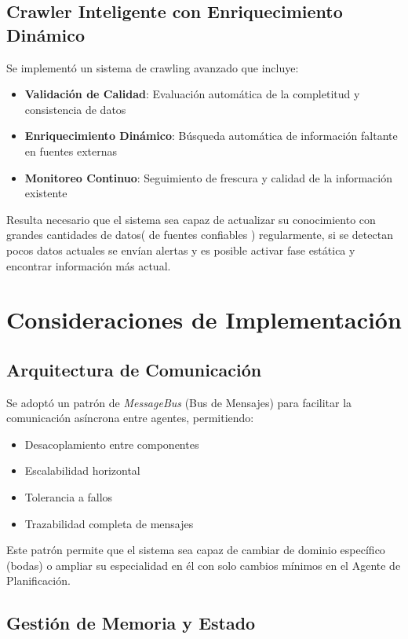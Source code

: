 \documentclass[runningheads,a4paper]{llncs}
\begin{document}
\subsection{Crawler Inteligente con Enriquecimiento Dinámico}

Se implementó un sistema de crawling avanzado que incluye:

\begin{itemize}
    \item \textbf{Validación de Calidad}: Evaluación automática de la completitud y consistencia de datos
    \item \textbf{Enriquecimiento Dinámico}: Búsqueda automática de información faltante en fuentes externas
    \item \textbf{Monitoreo Continuo}: Seguimiento de frescura y calidad de la información existente
\end{itemize}

Resulta necesario que el sistema sea capaz de actualizar su conocimiento con grandes cantidades de datos( de fuentes confiables ) regularmente, si se detectan pocos datos actuales se envían alertas y es posible activar fase estática y encontrar información más actual.

\section{Consideraciones de Implementación}

\subsection{Arquitectura de Comunicación}

Se adoptó un patrón de \textit{MessageBus} (Bus de Mensajes) para facilitar la comunicación asíncrona entre agentes, permitiendo:

\begin{itemize}
    \item Desacoplamiento entre componentes
    \item Escalabilidad horizontal
    \item Tolerancia a fallos
    \item Trazabilidad completa de mensajes
\end{itemize}

Este patrón permite que el sistema sea capaz de cambiar de dominio específico (bodas) o ampliar su especialidad en él con solo cambios mínimos en el Agente de Planificación.

\subsection{Gestión de Memoria y Estado}
\end{document}
